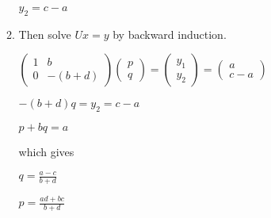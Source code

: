 \documentclass{article}
\begin{document}
\begin{enumerate}
\begin{enumerate}
 \begin{center} $y_2=c-a$ \end{center}
\item Then solve $Ux=y$ by backward induction.
 \begin{center} $\begin{pmatrix}
  1 & b \\
  0 & -(b+d)
 \end{pmatrix}
 \begin{pmatrix}
  p \\
  q
 \end{pmatrix}
 =
   \begin{pmatrix}
  y_1 \\
  y_2
 \end{pmatrix}
 =
  \begin{pmatrix}
  a \\
  c-a
 \end{pmatrix}$ \end{center}
 \begin{center}$ -(b+d)q=y_2=c-a $ \end{center}
 \begin{center}$p+b q=a $ \end{center}
which gives
 \begin{center}$ q=\frac{a-c}{b+d} $ \end{center}
 \begin{center}$ p = \frac{ad+bc}{b+d} $ \end{center}
\end{enumerate}
\end{enumerate}
\end{document}
